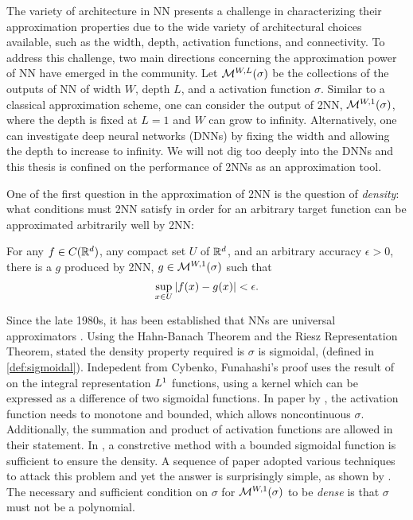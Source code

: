 
The variety of architecture in NN presents a challenge in characterizing their
approximation properties due to the wide variety of architectural choices
available, such as the width, depth, activation functions, and connectivity. To
address this challenge, two main directions concerning the approximation power
of NN have emerged in the community. Let $\mathcal{M}^{ {W}, {L} }( {\sigma} )$ be the
collections of the outputs of NN of width $W$, depth $L$, and a activation
function $\sigma$. Similar to a classical approximation scheme, one can consider
the output of 2NN, $\mathcal{M}^{ {W}, {1} }( {\sigma} )$, where the depth is fixed at $L=1$
and $W$ can grow to infinity. Alternatively, one can investigate deep neural
networks (DNNs) by fixing the width and allowing the depth to increase to
infinity. We will not dig too deeply into the DNNs and this thesis is confined
on the performance of 2NNs as an approximation tool.


One of the first question in the approximation of 2NN is the question of
\textit{density}: what conditions must 2NN satisfy in order for an arbitrary
target function can be approximated arbitrarily well by 2NN:

For any $f \in C(\mathbb{R}^d)$, any compact set $U$ of $\mathbb{R}^d$, and an arbitrary
accuracy $\epsilon > 0$, there is a $g$ produced by 2NN, $g \in
\mathcal{M}^{ {W}, {1} }( {\sigma} )$ such that 
\begin{equation*}
    \sup_{x \in U} \left| f(x) - g(x) \right| < \epsilon.
\end{equation*}

Since the late 1980s, it has been established that NNs are universal
approximators \citep{carrollConstructionNeuralNets1989,
cybenkoApproximationSuperpositionsSigmoidal1989,
hornikMultilayerFeedforwardNetworks1989a,
funahashiApproximateRealizationContinuous1989}. Using the Hahn-Banach Theorem
and the Riesz Representation Theorem,
\cite{cybenkoApproximationSuperpositionsSigmoidal1989} stated the density
property required is $\sigma$ is sigmoidal, (defined in \eqref{def:sigmoidal}).
Indepedent from Cybenko, Funahashi’s proof uses the result of
\cite{irieCapabilitiesThreelayeredPerceptrons1988} on the integral
representation $L^{1}$ functions, using a kernel which can be expressed as a
difference of two sigmoidal functions. In paper by
\cite{hornikMultilayerFeedforwardNetworks1989a}, the activation function needs
to monotone and bounded, which allows noncontinuous $\sigma$. Additionally, the
summation and product of activation functions are allowed in their statement. In
\cite{jonesSimpleLemmaGreedy1992}, a constrctive method with a bounded sigmoidal
function is sufficient to ensure the density. A sequence of paper adopted
various techniques to attack this problem and yet the answer is surprisingly
simple, as shown by \cite{leshnoMultilayerFeedforwardNetworks1993}. The
necessary and sufficient condition on $\sigma$ for $\mathcal{M}^{ {W}, {1} }( {\sigma} )$ to be
\textit{dense} is that $\sigma$ must not be a polynomial. 


